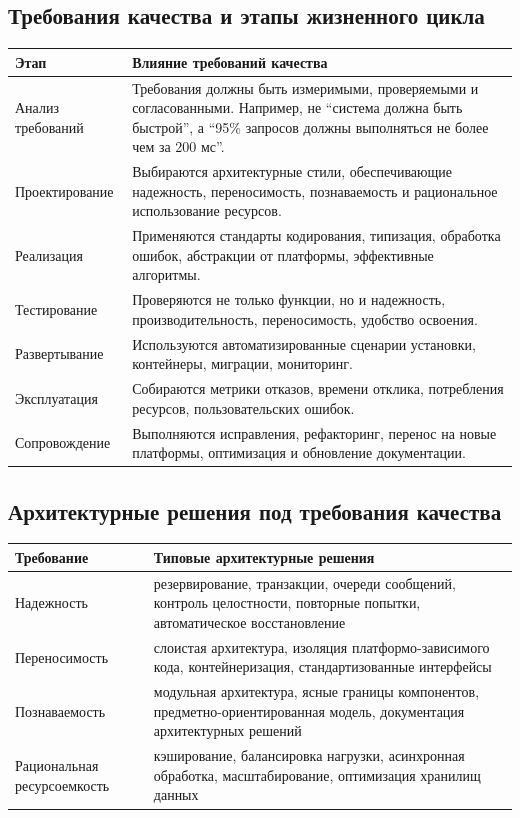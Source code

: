 \documentclass[12pt,a4paper]{article}
\begin{document}
\subsection{Требования качества и этапы жизненного цикла}

\begin{longtable}{p{} p{}}
\toprule
\textbf{Этап} & \textbf{Влияние требований качества} \\
\midrule
Анализ требований & Требования должны быть измеримыми, проверяемыми и согласованными. Например, не ``система должна быть быстрой'', а ``95\% запросов должны выполняться не более чем за 200 мс''. \\
\midrule
Проектирование & Выбираются архитектурные стили, обеспечивающие надежность, переносимость, познаваемость и рациональное использование ресурсов. \\
\midrule
Реализация & Применяются стандарты кодирования, типизация, обработка ошибок, абстракции от платформы, эффективные алгоритмы. \\
\midrule
Тестирование & Проверяются не только функции, но и надежность, производительность, переносимость, удобство освоения. \\
\midrule
Развертывание & Используются автоматизированные сценарии установки, контейнеры, миграции, мониторинг. \\
\midrule
Эксплуатация & Собираются метрики отказов, времени отклика, потребления ресурсов, пользовательских ошибок. \\
\midrule
Сопровождение & Выполняются исправления, рефакторинг, перенос на новые платформы, оптимизация и обновление документации. \\
\bottomrule
\end{longtable}

\subsection{Архитектурные решения под требования качества}

\begin{longtable}{p{} p{}}
\toprule
\textbf{Требование} & \textbf{Типовые архитектурные решения} \\
\midrule
Надежность & резервирование, транзакции, очереди сообщений, контроль целостности, повторные попытки, автоматическое восстановление \\
\midrule
Переносимость & слоистая архитектура, изоляция платформо-зависимого кода, контейнеризация, стандартизованные интерфейсы \\
\midrule
Познаваемость & модульная архитектура, ясные границы компонентов, предметно-ориентированная модель, документация архитектурных решений \\
\midrule
Рациональная ресурсоемкость & кэширование, балансировка нагрузки, асинхронная обработка, масштабирование, оптимизация хранилищ данных \\
\bottomrule
\end{longtable}
\end{document}
